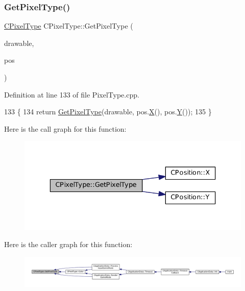 \subsubsection{\texorpdfstring{Get\+Pixel\+Type()}{GetPixelType()}\hspace{0.1cm}{\footnotesize\ttfamily [1/2]}}
{\footnotesize\ttfamily \hyperlink{classCPixelType}{C\+Pixel\+Type} C\+Pixel\+Type\+::\+Get\+Pixel\+Type (\begin{DoxyParamCaption}\item[{Gdk\+Drawable $\ast$}]{drawable,  }\item[{const \hyperlink{classCPosition}{C\+Position} \&}]{pos }\end{DoxyParamCaption})\hspace{0.3cm}{\ttfamily [static]}}



Definition at line 133 of file Pixel\+Type.\+cpp.


\begin{DoxyCode}
133                                                                               \{
134     \textcolor{keywordflow}{return} \hyperlink{classCPixelType_af38a22feec4bef33deeb628b0877d464}{GetPixelType}(drawable, pos.\hyperlink{classCPosition_a9a6b94d3b91df1492d166d9964c865fc}{X}(), pos.\hyperlink{classCPosition_a1aa8a30e2f08dda1f797736ba8c13a87}{Y}());
135 \}
\end{DoxyCode}
Here is the call graph for this function\+:\nopagebreak
\begin{figure}[H]
\begin{center}
\leavevmode
\includegraphics[width=336pt]{classCPixelType_af38a22feec4bef33deeb628b0877d464_cgraph}
\end{center}
\end{figure}
Here is the caller graph for this function\+:\nopagebreak
\begin{figure}[H]
\begin{center}
\leavevmode
\includegraphics[width=350pt]{classCPixelType_af38a22feec4bef33deeb628b0877d464_icgraph}
\end{center}
\end{figure}
\hypertarget{classCPixelType_a91ab76ebf6c87934a8738018686746d4}{}\label{classCPixelType_a91ab76ebf6c87934a8738018686746d4} 
